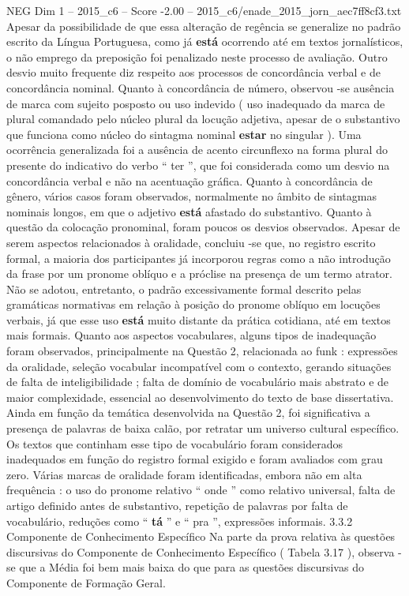 \begin{textsample}{NEG Dim 1 – 2015\_c6 – Score -2.00 – 2015\_c6/enade\_2015\_jorn\_aec7ff8cf3.txt}
Apesar da possibilidade de que essa alteração de regência se generalize no padrão escrito da Língua Portuguesa, como já \textbf{está} ocorrendo até em textos jornalísticos, o não emprego da preposição foi penalizado neste processo de avaliação.
Outro desvio muito frequente diz respeito aos processos de concordância verbal e de concordância nominal.
Quanto à concordância de número, observou -se ausência de marca com sujeito posposto ou uso indevido ( uso inadequado da marca de plural comandado pelo núcleo plural da locução adjetiva, apesar de o substantivo que funciona como núcleo do sintagma nominal \textbf{estar} no singular ).
Uma ocorrência generalizada foi a ausência de acento circunflexo na forma plural do presente do indicativo do verbo “ ter ”, que foi considerada como um desvio na concordância verbal e não na acentuação gráfica.
Quanto à concordância de gênero, vários casos foram observados, normalmente no âmbito de sintagmas nominais longos, em que o adjetivo \textbf{está} afastado do substantivo.
Quanto à questão da colocação pronominal, foram poucos os desvios observados.
Apesar de serem aspectos relacionados à oralidade, concluiu -se que, no registro escrito formal, a maioria dos participantes já incorporou regras como a não introdução da frase por um pronome oblíquo e a próclise na presença de um termo atrator.
Não se adotou, entretanto, o padrão excessivamente formal descrito pelas gramáticas normativas em relação à posição do pronome oblíquo em locuções verbais, já que esse uso \textbf{está} muito distante da prática cotidiana, até em textos mais formais.
Quanto aos aspectos vocabulares, alguns tipos de inadequação foram observados, principalmente na Questão 2, relacionada ao funk : expressões da oralidade, seleção vocabular incompatível com o contexto, gerando situações de falta de inteligibilidade ; falta de domínio de vocabulário mais abstrato e de maior complexidade, essencial ao desenvolvimento do texto de base dissertativa.
Ainda em função da temática desenvolvida na Questão 2, foi significativa a presença de palavras de baixa calão, por retratar um universo cultural específico.
Os textos que continham esse tipo de vocabulário foram considerados inadequados em função do registro formal exigido e foram avaliados com grau zero.
Várias marcas de oralidade foram identificadas, embora não em alta frequência : o uso do pronome relativo “ onde ” como relativo universal, falta de artigo definido antes de substantivo, repetição de palavras por falta de vocabulário, reduções como “ \textbf{tá} ” e “ pra ”, expressões informais. 3.3.2 Componente de Conhecimento Específico Na parte da prova relativa às questões discursivas do Componente de Conhecimento Específico ( Tabela 3.17 ), observa -se que a Média foi bem mais baixa do que para as questões discursivas do Componente de Formação Geral.

\end{textsample}
